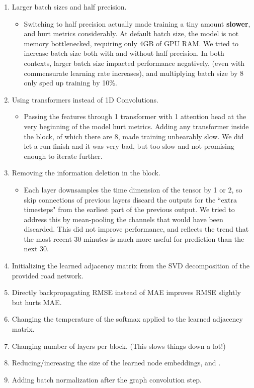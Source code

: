 \documentclass[10pt]{article}
\begin{document}
\begin{enumerate}
\begin{itemize}
    \end{itemize}
    \item Larger batch sizes and half precision.
    \begin{itemize}
    \item Switching to half precision actually made training a tiny amount \textbf{slower}, and hurt metrics considerably. At default batch size, the model is not memory bottlenecked, requiring only 4GB of GPU RAM. We tried to increase batch size both with and without half precision. In both contexts, larger batch size impacted performance negatively, (even with commensurate learning rate increases), and multiplying batch size by 8 only sped up training by 10\%.  
    \end{itemize}
    \item Using transformers instead of 1D Convolutions.
    \begin{itemize}
        \item  Passing  the features through 1 transformer with 1 attention head at the very beginning of the model hurt metrics. Adding any transformer inside the block, of which there are 8, made training unbearably slow. We did let a run finish and it was very bad, but too slow and not promising enough to iterate further.
    \end{itemize}
    \item Removing the information deletion in the block. 
    \begin{itemize}
        \item Each layer downsamples the time dimension of the tensor by 1 or 2, so skip connections of previous layers discard the outputs for the ``extra timesteps" from the earliest part of the previous output.  We tried to address this by mean-pooling the channels that would have been discarded. This did not improve performance, and reflects the trend that the most recent 30 minutes is much more useful for prediction than the next 30.
    \end{itemize}
    \item Initializing the learned adjacency matrix from the SVD decomposition of the provided road network.
    \item Directly backpropagating RMSE instead of MAE improves RMSE slightly but hurts MAE.
    \item Changing the temperature of the softmax applied to the learned adjacency matrix.
    \item Changing number of layers per block. (This slows things down a lot!)
    \item Reducing/increasing the size of the learned node embeddings,  and .
    \item Adding batch normalization after the graph convolution step.
\end{enumerate}
\end{document}
